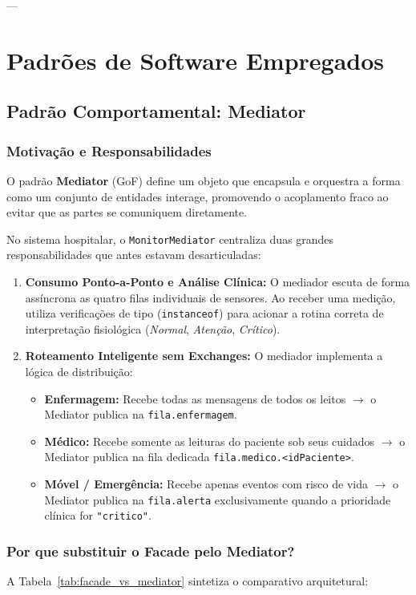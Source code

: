 \documentclass[12pt,a4paper]{article}
\begin{document}
---

\section{Padrões de Software Empregados}

\subsection{Padrão Comportamental: Mediator}

\subsubsection{Motivação e Responsabilidades}
O padrão \textbf{Mediator} (GoF) define um objeto que encapsula e orquestra a forma como um conjunto de entidades interage, promovendo o acoplamento fraco ao evitar que as partes se comuniquem diretamente.

No sistema hospitalar, o \texttt{MonitorMediator} centraliza duas grandes responsabilidades que antes estavam desarticuladas:
\begin{enumerate}
    \item \textbf{Consumo Ponto-a-Ponto e Análise Clínica:} O mediador escuta de forma assíncrona as quatro filas individuais de sensores. Ao receber uma medição, utiliza verificações de tipo (\texttt{instanceof}) para acionar a rotina correta de interpretação fisiológica (\textit{Normal}, \textit{Atenção}, \textit{Crítico}).
    \item \textbf{Roteamento Inteligente sem Exchanges:} O mediador implementa a lógica de distribuição:
    \begin{itemize}
        \item \textbf{Enfermagem:} Recebe todas as mensagens de todos os leitos $\rightarrow$ o Mediator publica na \texttt{fila.enfermagem}.
        \item \textbf{Médico:} Recebe somente as leituras do paciente sob seus cuidados $\rightarrow$ o Mediator publica na fila dedicada \texttt{fila.medico.<idPaciente>}.
        \item \textbf{Móvel / Emergência:} Recebe apenas eventos com risco de vida $\rightarrow$ o Mediator publica na \texttt{fila.alerta} exclusivamente quando a prioridade clínica for \texttt{"critico"}.
    \end{itemize}
\end{enumerate}

\subsubsection{Por que substituir o Facade pelo Mediator?}
A Tabela~\ref{tab:facade_vs_mediator} sintetiza o comparativo arquitetural:
\end{document}
